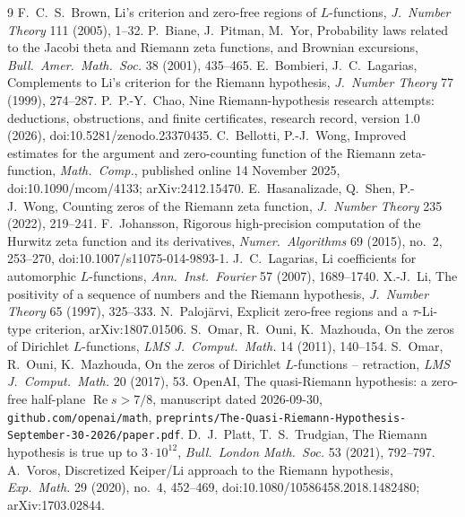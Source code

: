 \documentclass[11pt]{article}
\theoremstyle{remark}
\renewcommand{\Re}{\operatorname{Re}}
\begin{document}
\begin{thebibliography}{9}
 F.~C.~S.~Brown, Li's criterion and zero-free regions of $L$-functions, \emph{J.\ Number Theory} 111 (2005), 1--32.
 P.~Biane, J.~Pitman, M.~Yor, Probability laws related to the Jacobi theta and Riemann zeta functions, and Brownian excursions, \emph{Bull.\ Amer.\ Math.\ Soc.} 38 (2001), 435--465.
 E.~Bombieri, J.~C.~Lagarias, Complements to Li's criterion for the Riemann hypothesis, \emph{J.\ Number Theory} 77 (1999), 274--287.
 P.~P.-Y.~Chao, Nine Riemann-hypothesis research attempts: deductions, obstructions, and finite certificates, research record, version 1.0 (2026), doi:10.5281/zenodo.23370435.
 C.~Bellotti, P.-J.~Wong, Improved estimates for the argument and zero-counting function of the Riemann zeta-function, \emph{Math.\ Comp.}, published online 14 November 2025, doi:10.1090/mcom/4133; arXiv:2412.15470.
 E.~Hasanalizade, Q.~Shen, P.-J.~Wong, Counting zeros of the Riemann zeta function, \emph{J.\ Number Theory} 235 (2022), 219--241.
 F.~Johansson, Rigorous high-precision computation of the Hurwitz zeta function and its derivatives, \emph{Numer.\ Algorithms} 69 (2015), no.~2, 253--270, doi:10.1007/s11075-014-9893-1.
 J.~C.~Lagarias, Li coefficients for automorphic $L$-functions, \emph{Ann.\ Inst.\ Fourier} 57 (2007), 1689--1740.
 X.-J.~Li, The positivity of a sequence of numbers and the Riemann hypothesis, \emph{J.\ Number Theory} 65 (1997), 325--333.
 N.~Paloj\"arvi, Explicit zero-free regions and a $\tau$-Li-type criterion, arXiv:1807.01506.
 S.~Omar, R.~Ouni, K.~Mazhouda, On the zeros of Dirichlet $L$-functions, \emph{LMS J.\ Comput.\ Math.} 14 (2011), 140--154.
 S.~Omar, R.~Ouni, K.~Mazhouda, On the zeros of Dirichlet $L$-functions -- retraction, \emph{LMS J.\ Comput.\ Math.} 20 (2017), 53.
 OpenAI, The quasi-Riemann hypothesis: a zero-free half-plane $\Re s>7/8$, manuscript dated 2026-09-30, \texttt{github.com/openai/math}, \texttt{preprints/The-Quasi-Riemann-Hypothesis-September-30-2026/paper.pdf}.
 D.~J.~Platt, T.~S.~Trudgian, The Riemann hypothesis is true up to $3\cdot10^{12}$, \emph{Bull.\ London Math.\ Soc.} 53 (2021), 792--797.
 A.~Voros, Discretized Keiper/Li approach to the Riemann hypothesis, \emph{Exp.\ Math.} 29 (2020), no.~4, 452--469, doi:10.1080/10586458.2018.1482480; arXiv:1703.02844.
\end{thebibliography}
\end{document}
